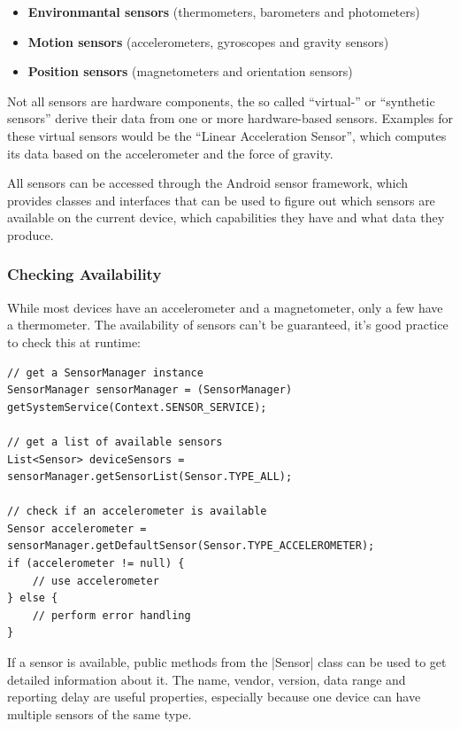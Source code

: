 \begin{itemize}[noitemsep]
	\item \textbf{Environmantal sensors} (thermometers, barometers and photometers)
	\item \textbf{Motion sensors} (accelerometers, gyroscopes and gravity sensors)
	\item \textbf{Position sensors} (magnetometers and orientation sensors)
\end{itemize}

Not all sensors are hardware components, the so called ``virtual-'' or ``synthetic sensors'' derive their data from one or more hardware-based sensors.
Examples for these virtual sensors would be the ``Linear Acceleration Sensor'', which computes its data based on the accelerometer and the force of gravity.

All sensors can be accessed through the Android sensor framework, which provides classes and interfaces that can be used to figure out which sensors are available on the current device, which capabilities they have and what data they produce.

\subsubsection{Checking Availability}
While most devices have an accelerometer and a magnetometer, only a few have a thermometer.
The availability of sensors can't be guaranteed, it's good practice to check this at runtime:

\begin{lstlisting}[label=getsensormanager]
// get a SensorManager instance
SensorManager sensorManager = (SensorManager) getSystemService(Context.SENSOR_SERVICE);

// get a list of available sensors
List<Sensor> deviceSensors = sensorManager.getSensorList(Sensor.TYPE_ALL);

// check if an accelerometer is available
Sensor accelerometer = sensorManager.getDefaultSensor(Sensor.TYPE_ACCELEROMETER);
if (accelerometer != null) {
	// use accelerometer
} else {
	// perform error handling
}
\end{lstlisting}

If a sensor is available, public methods from the |Sensor|\cite{androiddocs:sensor} class can be used to get detailed information about it.
The name, vendor, version, data range and reporting delay are useful properties, especially because one device can have multiple sensors of the same type.

